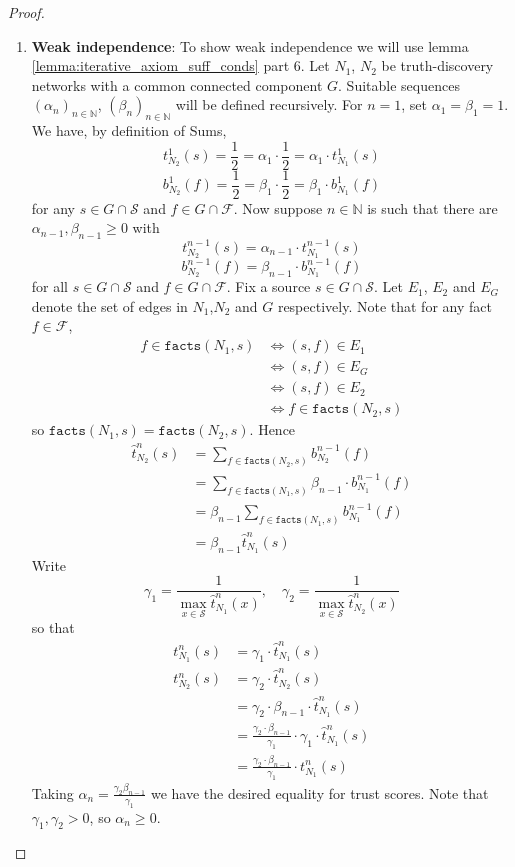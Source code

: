 \documentclass{article}
\theoremstyle{definition} \newtheorem{definition}{Definition}
\theoremstyle{definition} \newtheorem{example}{Example}
\theoremstyle{plain} \newtheorem{axiom}{Axiom}
\theoremstyle{plain} \newtheorem*{remark}{Remark}
\theoremstyle{remark} \newtheorem*{notation}{Notation}
\theoremstyle{plain} \newtheorem{lemma}{Lemma}
\theoremstyle{plain} \newtheorem{theorem}{Theorem}
\theoremstyle{plain} \newtheorem{proposition}{Proposition}
\renewcommand{\S}{\mathcal{S}}  %
\newcommand{\F}{\mathcal{F}}
\newcommand{\Nat}{\mathbb{N}}
\newcommand{\fact}{\texttt{facts}}
\begin{document}
\begin{proof}
\begin{enumerate}
\item\textbf{Weak independence}: To show weak independence we will use lemma
\ref{lemma:iterative_axiom_suff_conds} part 6. Let $N_1$, $N_2$ be
truth-discovery networks with a common connected component $G$. Suitable
sequences $(\alpha_n)_{n \in \Nat}$, $(\beta_n)_{n \in \Nat}$ will be defined
recursively. For $n = 1$, set $\alpha_1 = \beta_1 = 1$. We have, by definition
of Sums,
\[
    t_{N_2}^1(s) = \frac{1}{2}
                 = \alpha_1 \cdot \frac{1}{2}
                 = \alpha_1 \cdot t_{N_1}^1(s)
\]
\[
    b_{N_2}^1(f) = \frac{1}{2}
                 = \beta_1 \cdot \frac{1}{2}
                 = \beta_1 \cdot b_{N_1}^1(f)
\]
for any $s \in G \cap \S$ and $f \in G \cap \F$. Now suppose $n \in \Nat$ is
such that there are $\alpha_{n - 1}, \beta_{n - 1}
\ge 0$ with
\[
    t_{N_2}^{n - 1}(s) = \alpha_{n - 1} \cdot t_{N_1}^{n - 1}(s)
\]
\[
    b_{N_2}^{n - 1}(f) = \beta_{n - 1} \cdot b_{N_1}^{n - 1}(f)
\]
for all $s \in G \cap \S$ and $f \in G \cap \F$. Fix a source $s \in G \cap
\S$. Let $E_1$, $E_2$ and $E_G$ denote the set of edges in $N_1$,$N_2$ and $G$
respectively. Note that for any fact $f \in \F$,
\begin{align*}
    f \in \fact(N_1, s) & \iff (s, f) \in E_1 \\
                        & \iff (s, f) \in E_G \\
                        & \iff (s, f) \in E_2 \\
                        & \iff f \in \fact(N_2, s)
\end{align*}
so $\fact(N_1, s) = \fact(N_2, s)$. Hence
\begin{align*}
    \hat{t}_{N_2}^n(s) & = \sum_{f \in \fact(N_2, s)}{b_{N_2}^{n - 1}(f)} \\
                       & = \sum_{f \in \fact(N_1, s)}{\beta_{n - 1} \cdot b_{N_1}^{n - 1}(f)} \\
                       & = \beta_{n - 1}\sum_{f \in \fact(N_1, s)}{b_{N_1}^{n - 1}(f)} \\
                       & = \beta_{n - 1}\hat{t}_{N_1}^n(s)
\end{align*}
Write
\[
    \gamma_1 = \frac{1}{\max\limits_{x \in \S}{\hat{t}_{N_1}^n(x)}},
    \quad
    \gamma_2 = \frac{1}{\max\limits_{x \in \S}{\hat{t}_{N_2}^n(x)}}
\]
so that
\begin{align*}
    t_{N_1}^n(s) & = \gamma_1 \cdot \hat{t}_{N_1}^n(s) \\
    t_{N_2}^n(s) & = \gamma_2 \cdot \hat{t}_{N_2}^n(s) \\
     & = \gamma_2 \cdot \beta_{n - 1} \cdot \hat{t}_{N_1}^n(s) \\
     & = \frac{\gamma_2 \cdot \beta_{n - 1}}{\gamma_1} \cdot \gamma_1 \cdot \hat{t}_{N_1}^n(s) \\
     & = \frac{\gamma_2 \cdot \beta_{n - 1}}{\gamma_1} \cdot t_{N_1}^n(s)
\end{align*}
Taking $\alpha_n = \frac{\gamma_2\beta_{n-1}}{\gamma_1}$ we have the desired
equality for trust scores. Note that $\gamma_1, \gamma_2 > 0$, so $\alpha_n \ge
0$.


\end{enumerate}
\end{proof}
\end{document}
